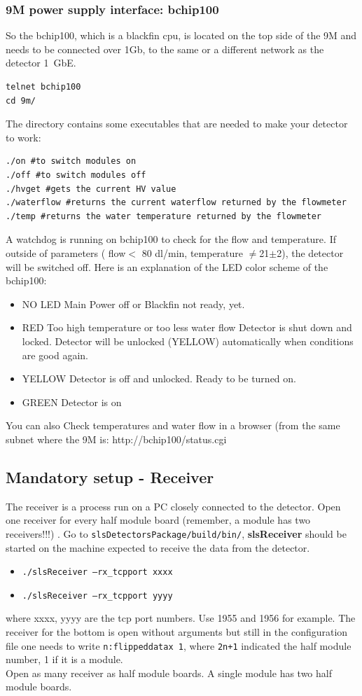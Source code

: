 \documentclass{article}
\begin{document}
\subsubsection{9M power supply interface: bchip100}\label{bchip100}
So the bchip100, which is a blackfin cpu, is located on the top side of the 9M and needs to be connected over 1Gb, to the same or a different network as the detector 1~GbE. 
 \begin{verbatim}
telnet bchip100
cd 9m/
\end{verbatim}
The directory contains some executables that are needed to make your detector to work:
 \begin{verbatim}
./on #to switch modules on
./off #to switch modules off
./hvget #gets the current HV value
./waterflow #returns the current waterflow returned by the flowmeter
./temp #returns the water temperature returned by the flowmeter
 \end{verbatim}
A watchdog is running on bchip100 to check for the flow and temperature. If outside of parameters ( flow$<$ 80 dl/min, temperature $\neq$21$\pm$2), the detector will be switched off. 
Here is an explanation of the LED color scheme of the bchip100: 
\begin{itemize}
\item NO LED  Main Power off or Blackfin not ready, yet.
\item RED     Too high temperature or too less water flow
        Detector is shut down and locked.
        Detector will be unlocked (YELLOW) automatically when conditions are good again.
\item YELLOW  Detector is off and unlocked. Ready to be turned on.
\item GREEN   Detector is on
\end{itemize}
You can also Check temperatures and water flow in a browser (from the same subnet where the 9M is: http://bchip100/status.cgi

\subsection{Mandatory setup - Receiver}

The receiver is a process run on a PC closely connected to the detector. Open one receiver for every half module board (remember, a module has two receivers!!!) . Go to {\tt{slsDetectorsPackage/build/bin/}}, \textbf{slsReceiver} should be started on the machine expected to receive the data from the detector.

\begin{itemize}
\item {\tt{./slsReceiver --rx\_tcpport xxxx}} 
\item {\tt{./slsReceiver --rx\_tcpport yyyy}}
\end{itemize}
where xxxx, yyyy are the tcp port numbers. Use 1955 and 1956 for example. The receiver for the bottom is open without arguments but still in the configuration file one needs to write {\tt{n:flippeddatax 1}}, where {\tt{2n+1}} indicated the half module number, 1 if it is a module.
\\ Open as many receiver as half module boards. A single module has two half module boards.
\end{document}
